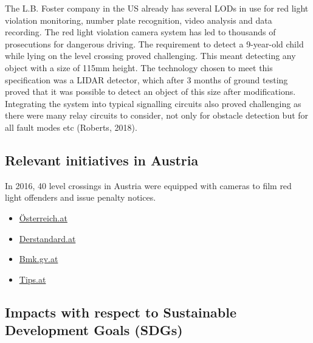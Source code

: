 \documentclass[
]{book}
\providecommand{\tightlist}{%
  \setlength{\itemsep}{0pt}\setlength{\parskip}{0pt}}
\begin{document}
The L.B. Foster company in the US already has several LODs in use for red light violation monitoring, number plate recognition, video analysis and data recording. The red light violation camera system has led to thousands of prosecutions for dangerous driving. The requirement to detect a 9-year-old child while lying on the level crossing proved challenging. This meant detecting any object with a size of 115mm height. The technology chosen to meet this specification was a LIDAR detector, which after 3 months of ground testing proved that it was possible to detect an object of this size after modifications. Integrating the system into typical signalling circuits also proved challenging as there were many relay circuits to consider, not only for obstacle detection but for all fault modes etc (Roberts, 2018).

\hypertarget{relevant-initiatives-in-austria-1}{%
\subsection*{Relevant initiatives in Austria}\label{relevant-initiatives-in-austria-1}}

In 2016, 40 level crossings in Austria were equipped with cameras to film red light offenders and issue penalty notices.

\begin{itemize}
\tightlist
\item
  \href{https://www.österreich.at/chronik/oebb-ueberwachen-bahnuebergaenge-mit-kameras/251039735}{Österreich.at}
\item
  \href{https://www.derstandard.at/story/2000038658674/im-vorjahr-124-unfaelle-bei-eisenbahnkreuzungen-mit-21-toten}{Derstandard.at}
\item
  \href{https://www.bmk.gv.at/themen/verkehr/eisenbahn/sicherheit/bahnuebergaenge/sicherhandeln.html}{Bmk.gv.at}
\item
  \href{https://www.tips.at/nachrichten/urfahr-umgebung/land-leute/519686-neuer-bahnschranken-fuer-mehr-sicherheit}{Tips.at}
\end{itemize}

\hypertarget{impacts-with-respect-to-sustainable-development-goals-sdgs-1}{%
\subsection*{Impacts with respect to Sustainable Development Goals (SDGs)}\label{impacts-with-respect-to-sustainable-development-goals-sdgs-1}}
\end{document}
